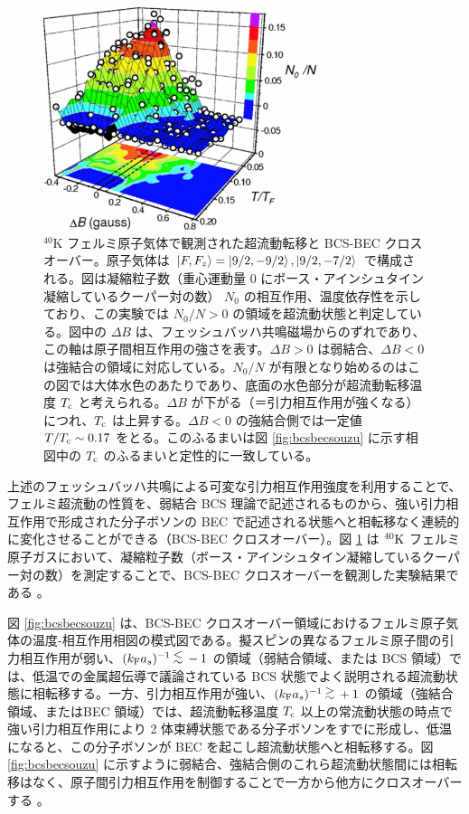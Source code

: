 \begin{figure}[t]
\centering
\includegraphics[width=80mm]{eps/bcs-bec-pota.eps}
\caption{${}^{40}\mathrm{K}$ フェルミ原子気体で観測された超流動転移と BCS-BEC クロスオーバー\cite{regal2004}。原子気体は $\ket{F, F_z} = \ket{9/2,-9/2}, \ket{9/2, -7/2}$ で構成される。図は凝縮粒子数（重心運動量 0 にボース・アインシュタイン凝縮しているクーパー対の数） $N_0$ の相互作用、温度依存性を示しており、この実験では $N_0/N>0$ の領域を超流動状態と判定している。図中の $\Delta B$ は、フェッシュバッハ共鳴磁場からのずれであり、この軸は原子間相互作用の強さを表す。$\Delta B>0$ は弱結合、$\Delta B<0$ は強結合の領域に対応している。$N_0/N$ が有限となり始めるのはこの図では大体水色のあたりであり、底面の水色部分が超流動転移温度 $T_{\text{c}}$ と考えられる。$\Delta B$ が下がる（＝引力相互作用が強くなる）につれ、$T_{\text{c}}$ は上昇する。$\Delta B <0$ の強結合側では一定値 $T/T_{\text{c}} \sim 0.17$ をとる。このふるまいは図 \ref{fig:bcsbecsouzu} に示す相図中の $T_{\text{c}}$ のふるまいと定性的に一致している。}
\label{fig:bcsbecpota}
\end{figure}


上述のフェッシュバッハ共鳴による可変な引力相互作用強度を利用することで、フェルミ超流動の性質を、弱結合 BCS 理論で記述されるものから、強い引力相互作用で形成された分子ボソンの BEC で記述される状態へと相転移なく連続的に変化させることができる（BCS-BEC クロスオーバー）。図 \ref{fig:bcsbecpota} は ${}^{40}\mathrm{K}$ フェルミ原子ガスにおいて、凝縮粒子数（ボース・アインシュタイン凝縮しているクーパー対の数）を測定することで、BCS-BEC クロスオーバーを観測した実験結果である \cite{regal2004}。

図 \ref{fig:bcsbecsouzu} は、BCS-BEC クロスオーバー領域におけるフェルミ原子気体の温度-相互作用相図の模式図である。擬スピンの異なるフェルミ原子間の引力相互作用が弱い、$\askfi\ltsim -1$ の領域（弱結合領域、または BCS 領域）では、低温での金属超伝導で議論されている BCS 状態でよく説明される超流動状態に相転移する。一方、引力相互作用が強い、$\askfi \gtsim +1$ の領域（強結合領域、またはBEC 領域）では、超流動転移温度 $T_{\text{c}}$ 以上の常流動状態の時点で強い引力相互作用により 2 体束縛状態である分子ボソンをすでに形成し、低温になると、この分子ボソンが BEC を起こし超流動状態へと相転移する。図 \ref{fig:bcsbecsouzu} に示すように弱結合、強結合側のこれら超流動状態間には相転移はなく、原子間引力相互作用を制御することで一方から他方にクロスオーバーする \cite{eagles1969,leggett1980,sademelo1993}。

